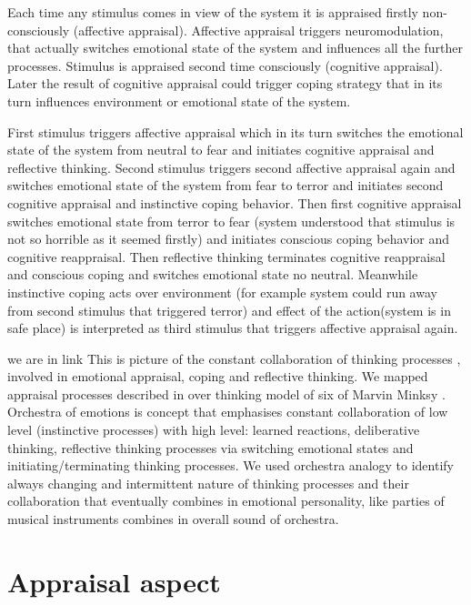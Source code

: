 Each time any stimulus comes in view of the system it is appraised firstly non-consciously (affective appraisal). Affective appraisal triggers neuromodulation, that actually switches emotional state of the system and influences all the further processes. Stimulus is appraised second time consciously (cognitive appraisal). Later the result of cognitive appraisal could trigger coping strategy that in its turn influences environment or emotional state of the system.

First stimulus triggers affective appraisal which in its turn switches the emotional state of the system from neutral to fear and initiates cognitive appraisal and reflective thinking. Second stimulus triggers second affective appraisal again and switches emotional state of the system from fear to terror and initiates second cognitive appraisal and instinctive coping behavior. Then first cognitive appraisal switches emotional state from terror to fear (system understood that stimulus is not so horrible as it seemed firstly) and initiates conscious coping behavior and cognitive reappraisal. Then reflective thinking terminates cognitive reappraisal and conscious coping and switches emotional state no neutral. Meanwhile instinctive coping acts over environment (for example system could run away from second stimulus that triggered terror) and effect of the action(system is in safe place) is interpreted as third stimulus that triggers affective appraisal again.

we are in link
This is picture of the constant collaboration of thinking processes \cite{emotionmachine}, involved in emotional appraisal, coping and reflective thinking. We mapped appraisal processes described in \cite{putting_appraisal_in_context, appraisal_determinants_of_emotions, appraisal_considered_as_a_process} over thinking model of six of Marvin Minksy \cite{emotionmachine}. Orchestra of emotions is concept that emphasises constant collaboration of low level (instinctive processes) with high level: learned reactions, deliberative thinking, reflective thinking processes via switching emotional states and initiating/terminating thinking processes. We used orchestra analogy to identify always changing and intermittent nature of thinking processes and their  collaboration that eventually combines in emotional personality, like parties of musical instruments combines in overall sound of orchestra.

\section{Appraisal aspect}

